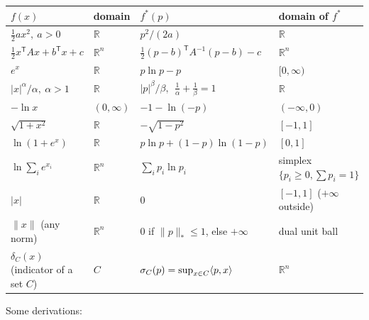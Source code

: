 \begin{center}
\begin{tabular}{@{}llll@{}}
\toprule
$f(x)$ & domain & $f^*(p)$ & domain of $f^*$\\
\midrule
$\tfrac12ax^2,\ a>0$ & $\mathbb{R}$ & $p^2/(2a)$ & $\mathbb{R}$\\[2pt]
$\tfrac12x^{\mathsf T}Ax+b^{\mathsf T}x+c$ & $\mathbb{R}^n$ & $\tfrac12(p-b)^{\mathsf T}A^{-1}(p-b)-c$ & $\mathbb{R}^n$\\[2pt]
$e^x$ & $\mathbb{R}$ & $p\ln p-p$ & $[0,\infty)$\\[2pt]
$|x|^\alpha/\alpha,\ \alpha>1$ & $\mathbb{R}$ & $|p|^\beta/\beta,\ \ \tfrac1\alpha+\tfrac1\beta=1$ & $\mathbb{R}$\\[2pt]
$-\ln x$ & $(0,\infty)$ & $-1-\ln(-p)$ & $(-\infty,0)$\\[2pt]
$\sqrt{1+x^2}$ & $\mathbb{R}$ & $-\sqrt{1-p^2}$ & $[-1,1]$\\[2pt]
$\ln(1+e^x)$ & $\mathbb{R}$ & $p\ln p+(1-p)\ln(1-p)$ & $[0,1]$\\[2pt]
$\ln\sum_ie^{x_i}$ & $\mathbb{R}^n$ & $\sum_ip_i\ln p_i$ & simplex $\{p_i\ge0,\sum p_i=1\}$\\[2pt]
$|x|$ & $\mathbb{R}$ & $0$ & $[-1,1]$ ($+\infty$ outside)\\[2pt]
$\|x\|$ (any norm) & $\mathbb{R}^n$ & $0$ if $\|p\|_*\le1$, else $+\infty$ & dual unit ball\\[2pt]
$\delta_C(x)$ (indicator of a set $C$) & $C$ & $\sigma_C(p)=\sup_{x\in C}\langle p,x\rangle$ & $\mathbb{R}^n$\\
\bottomrule
\end{tabular}
\end{center}

Some derivations:

